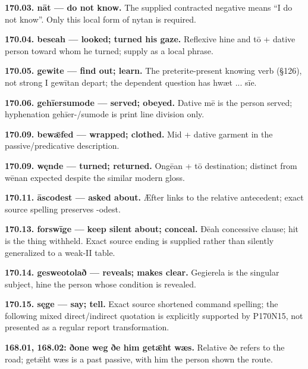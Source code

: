 \textbf{170.03. nāt — do not know.} The supplied contracted negative means “I do not know”. Only this local form of nytan is required.

\textbf{170.04. beseah — looked; turned his gaze.} Reflexive hine and tō + dative person toward whom he turned; supply as a local phrase.

\textbf{170.05. gewite — find out; learn.} The preterite-present knowing verb (§126), not strong I gewītan depart; the dependent question has hwæt ... sīe.

\textbf{170.06. gehīersumode — served; obeyed.} Dative mē is the person served; hyphenation gehīer-/\allowbreak{}sumode is print line division only.

\textbf{170.09. bewǣfed — wrapped; clothed.} Mid + dative garment in the passive/\allowbreak{}predicative description.

\textbf{170.09. węnde — turned; returned.} Ongēan + tō destination; distinct from wēnan expected despite the similar modern gloss.

\textbf{170.11. āscodest — asked about.} Æfter links to the relative antecedent; exact source spelling preserves -odest.

\textbf{170.13. forswīge — keep silent about; conceal.} Ðēah concessive clause; hit is the thing withheld. Exact source ending is supplied rather than silently generalized to a weak-II table.

\textbf{170.14. gesweotolað — reveals; makes clear.} Gegierela is the singular subject, hine the person whose condition is revealed.

\textbf{170.15. sęge — say; tell.} Exact source shortened command spelling; the following mixed direct/\allowbreak{}indirect quotation is explicitly supported by P170N15, not presented as a regular report transformation.

\textbf{168.01, 168.02: ðone weg ðe him getǣht wæs.} Relative ðe refers to the road; getǣht wæs is a past passive, with him the person shown the route.


